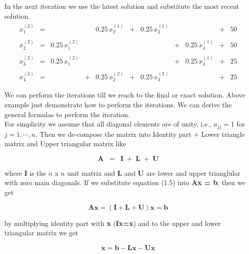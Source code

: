 In the next iteration we use the latest solution and substitute the most recent solution.
\begin{eqnarray}
\begin{array}{rrrrrrrrrrr}
x_1^{(2)}    &=&             & & 0.25\,x_2^{(1)}   &+& 0.25\,x_3^{(1)}   &&              &+& 50 \\ \\

x_2^{(2)}    &=& 0.25\,x_1^{(2)}   & &             & &             &+& 0.25\,x_4^{(1)}   &+& 50 \\ \\

x_3^{(2)}    &=& 0.25\,x_1^{(2)}   & &             & &             &+& 0.25\,x_4^{(1)}   &+& 25 \\ \\             
x_4^{(2)}    &=& 	     &+& 0.25\,x_2^{(2)}   &+& 0.25\,x_3^{(2)}   & &             &+& 25 \\ \\ 
\end{array}
\end{eqnarray}
We can perform the iterations till we reach to the final or exact solution. Above example just demonstrate how to perform the iterations. We can derive the general formulas to perform the iteration. \\

For simplicity we assume that all diagonal elements are of unity, i.e., $a_{jj}=1$ for $j=1,\cdots,n$. Then we de-compose the matrix into Identity part + Lower triangle matrix and Upper triangular matrix like

\begin{equation}
\mathrm{\mathbf{A\;\;=\;\;I\;+\;L\;+\;U}}
\end{equation}

where \textbf{I} is the $n$ x $n$ unit matrix and \textbf{L} and \textbf{U} are lower and upper trianglular with zero main diagonals. If we substitute equation (1.5) into \textbf{Ax = b}, then we get 

\begin{equation}
\mathrm{\mathbf{Ax=(I+L+U)x=b}}
\end{equation}

by multiplying identity part with \textbf{x} (\textbf{Ix=x}) and to the upper and lower triangular matrix we get

\begin{equation}
\mathrm{\mathbf{x=b-Lx-Ux}}
\end{equation}

